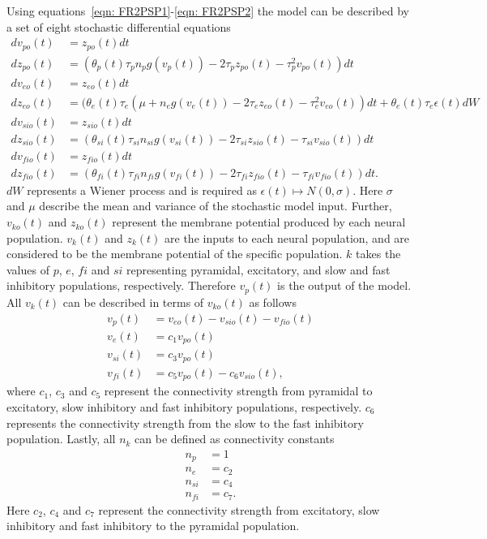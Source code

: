 Using equations~\ref{eqn: FR2PSP1}-\ref{eqn: FR2PSP2} the model can be described by a set of eight stochastic differential equations \begin{align}%
dv_{po}(t)&= z_{po}(t)dt\\
dz_{po}(t)&=(\theta_{p}(t)\tau_{p}n_{p}g(v_{p}(t))-2\tau_{p}z_{po}(t)-\tau_{p}^{2}v_{po}(t))dt\\
dv_{eo}(t)&= z_{eo}(t)dt\\
dz_{eo}(t)&=(\theta_{e}(t)\tau_{e}(\mu +n_{e}g(v_{e}(t))-2\tau_{e}z_{eo}(t)-\tau_{e}^{2}v_{eo}(t))dt + \theta_{e}(t)\tau_{e}\epsilon(t)dW\\
dv_{sio}(t)&= z_{sio}(t)dt\\
dz_{sio}(t)&=(\theta_{si}(t)\tau_{si}n_{si}g(v_{si}(t))-2\tau_{si}z_{sio}(t)-\tau_{si}v_{sio}(t))dt\\
dv_{fio}(t)&= z_{fio}(t)dt\\
dz_{fio}(t)&=(\theta_{fi}(t)\tau_{fi}n_{fi}g(v_{fi}(t))-2\tau_{fi}z_{fio}(t)-\tau_{fi}v_{fio}(t))dt.
\end{align} $dW$ represents a Wiener process and is required as $\epsilon(t)\longmapsto N(0,\sigma)$. Here $\sigma$ and $\mu$ describe the mean and variance of the stochastic model input. Further, $v_{ko}(t) $ and $z_{ko}(t) $ represent the membrane potential produced by each neural population. $v_{k}(t) $ and $z_{k}(t) $ are the inputs to each neural population, and are considered to be the membrane potential of the specific population. $k$ takes the values of $p$, $e$, $fi$ and $si$ representing pyramidal, excitatory, and slow and fast inhibitory populations, respectively. Therefore $v_{p}(t) $ is the output of the model. All $v_{k}(t) $ can be described in terms of $v_{ko}(t) $ as follows \begin{align}%
v_{p}(t) &= v_{eo}(t)-v_{sio}(t)-v_{fio}(t)\\
v_{e}(t) &= c_{1}v_{po}(t)\\
v_{si}(t) &= c_{3}v_{po}(t)\\
v_{fi}(t) &= c_{5}v_{po}(t)-c_{6}v_{sio}(t),
\end{align} where $c_{1}$, $c_{3}$ and $c_{5}$ represent the connectivity strength from pyramidal to excitatory, slow inhibitory and fast inhibitory populations, respectively. $c_{6}$ represents the connectivity strength from the slow to the fast inhibitory population. Lastly, all $n_{k}$ can be defined as connectivity constants \begin{align}%
n_{p} &=1\\
n_{e} &=c_{2}\\
n_{si} &=c_{4}\\
n_{fi} &=c_{7}.
\end{align} Here $c_{2}$, $c_4$ and $c_7$ represent the connectivity strength from excitatory, slow inhibitory and fast inhibitory to the pyramidal population.

